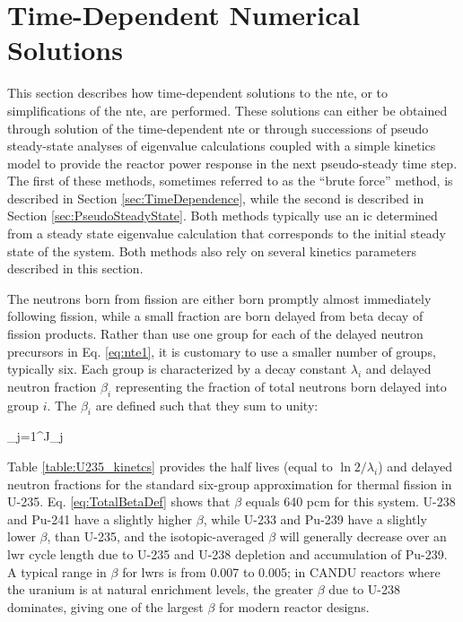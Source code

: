\section{Time-Dependent Numerical Solutions}
\label{sec:Kinetics}

This section describes how time-dependent solutions to the \gls{nte}, or to simplifications of the \gls{nte}, are performed. These solutions can either be obtained through solution of the time-dependent \gls{nte} or through successions of pseudo steady-state analyses of eigenvalue calculations coupled with a simple kinetics model to provide the reactor power response in the next pseudo-steady time step. The first of these methods, sometimes referred to as the ``brute force'' method, is described in Section \ref{sec:TimeDependence}, while the second is described in Section \ref{sec:PseudoSteadyState}. Both methods typically use an \gls{ic} determined from a steady state eigenvalue calculation that corresponds to the initial steady state of the system. Both methods also rely on several kinetics parameters described in this section.

The neutrons born from fission are either born promptly almost immediately following fission, while a small fraction are born delayed from beta decay of fission products. Rather than use one group for each of the delayed neutron precursors in Eq. \eqref{eq:nte1}, it is customary to use a smaller number of groups, typically six. Each group is characterized by a decay constant \(\lambda_i\) and delayed neutron fraction \(\beta_i\) representing the fraction of total neutrons born delayed into group \(i\). The \(\beta_i\) are defined such that they sum to unity:

\beq
\label{eq:TotalBetaDef}
\beta\equiv\sum_{j=1}^J\beta_j
\eeq

Table \ref{table:U235_kinetcs} provides the half lives (equal to \(\ln{2}/\lambda_i\)) and delayed neutron fractions for the standard six-group approximation for thermal fission in U-235. Eq. \eqref{eq:TotalBetaDef} shows that \(\beta\) equals 640 pcm for this system. U-238 and Pu-241 have a slightly higher \(\beta\), while U-233 and Pu-239 have a slightly lower \(\beta\), than U-235, and the isotopic-averaged \(\beta\) will generally decrease over an \gls{lwr} cycle length due to U-235 and U-238 depletion and accumulation of Pu-239. A typical range in \(\beta\) for \glspl{lwr} is from 0.007 to 0.005; in CANDU reactors where the uranium is at natural enrichment levels, the greater \(\beta\) due to U-238 dominates, giving one of the largest \(\beta\) for modern reactor designs.

